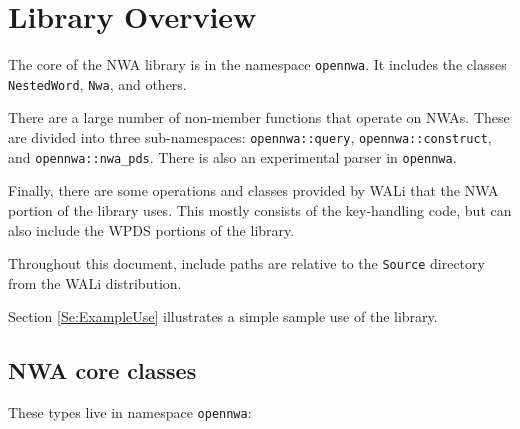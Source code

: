 \tableofcontents

\vspace{2\baselineskip}




\clearpage

\section{Library Overview}
\label{Se:Nested Word Automata}

The core of the NWA library is in the namespace \texttt{opennwa}. It
includes the classes \texttt{NestedWord}, \texttt{Nwa}, and others.

There are a large number of non-member functions that operate on NWAs. These
are divided into three sub-namespaces:
\texttt{opennwa::query}, \texttt{opennwa::construct}, and
\texttt{opennwa::nwa\_pds}. There is also an experimental parser in
\texttt{opennwa}.

Finally, there are some operations and classes provided by WALi that the NWA
portion of the library uses. This mostly consists of the key-handling code,
but can also include the WPDS portions of the library.

Throughout this document, include paths are relative to the \texttt{Source}
directory from the WALi distribution.

Section \ref{Se:ExampleUse} illustrates a simple sample use of the library.

\subsection{NWA core classes}

These types live in namespace \texttt{opennwa}:

